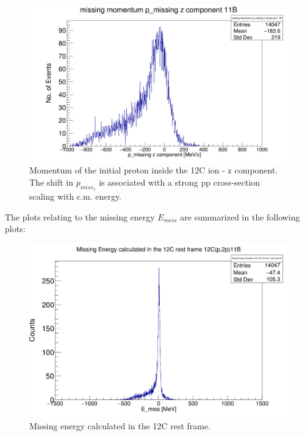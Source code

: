 \documentclass{report}
\begin{document}
\begin{figure}[!htb]
  \includegraphics[width=\linewidth]{missing_mom_11B_z_comp.png}
  \caption{Momentum of the initial proton inside the 12C ion - z component. The shift in $p_{miss_z}$ is associated with a strong pp cross-section scaling with c.m. energy.}
\end{figure}
\newpage
The plots relating to the missing energy $E_{miss}$ are summarized in the following plots:\newline
\begin{figure}[!htb]
  \includegraphics[width=\linewidth]{missing_E_12C_11B.png}
  \caption{Missing energy calculated in the 12C rest frame.}
\end{figure}
\end{document}
